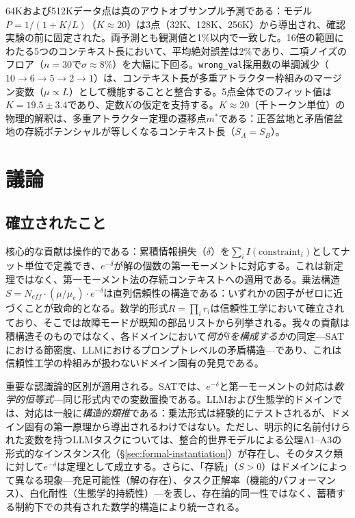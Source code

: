 \documentclass[11pt,a4paper]{article}
\begin{document}
\noindent 64Kおよび512Kデータ点は真のアウトオブサンプル予測である：モデル$P = 1/(1 + K/L)$（$K \approx 20$）は3点（32K、128K、256K）から導出され、確認実験の前に固定された。両予測とも観測値と1\%以内で一致した。16倍の範囲にわたる5つのコンテキスト長において、平均絶対誤差は2\%であり、二項ノイズのフロア（$n = 30$で$\sigma \approx 8\%$）を大幅に下回る。\texttt{wrong\_val}採用数の単調減少（$10 \to 6 \to 5 \to 2 \to 1$）は、コンテキスト長が多重アトラクター枠組みのマージン変数（$\mu \propto L$）として機能することと整合する。5点全体でのフィット値は$K = 19.5 \pm 3.4$であり、定数$K$の仮定を支持する。$K \approx 20$（千トークン単位）の物理的解釈は、多重アトラクター定理の遷移点$m^*$である：正答盆地と矛盾値盆地の存続ポテンシャルが等しくなるコンテキスト長（$S_A = S_B$）。

\section{議論}
\label{sec:discussion}

\subsection{確立されたこと}

核心的な貢献は操作的である：累積情報損失（$\delta$）を$\sum_i I(\text{constraint}_i)$としてナット単位で定義でき、$e^{-\delta}$が解の個数の第一モーメントに対応する。これは新定理ではなく、第一モーメント法\cite{alon2016}の存続コンテキストへの適用である。乗法構造$S = N_{eff} \cdot (\mu/\mu_c) \cdot e^{-\delta}$は直列信頼性の構造である：いずれかの因子がゼロに近づくことが致命的となる。数学的形式$R = \prod_i r_i$は信頼性工学において確立されており\cite{barlow1975}、そこでは故障モードが既知の部品リストから列挙される。我々の貢献は積構造そのものではなく、各ドメインにおいて\emph{何が$\delta$を構成するか}の同定---SATにおける節密度、LLMにおけるプロンプトレベルの矛盾構造---であり、これは信頼性工学の枠組みが扱わないドメイン固有の発見である。

重要な認識論的区別が適用される。SATでは、$e^{-\delta}$と第一モーメントの対応は\emph{数学的恒等式}---同じ形式内での変数置換である。LLMおよび生態学的ドメインでは、対応は一般に\emph{構造的類推}である：乗法形式は経験的にテストされるが、ドメイン固有の第一原理から導出されるわけではない。ただし、明示的に名前付けられた変数を持つLLMタスクについては、整合的世界モデルによる公理A1--A3の形式的なインスタンス化（\S\ref{sec:formal-instantiation}）が存在し、そのタスク類に対して$e^{-\delta}$は定理として成立する。さらに、「存続」（$S > 0$）はドメインによって異なる現象---充足可能性（解の存在）、タスク正解率（機能的パフォーマンス）、白化耐性（生態学的持続性）---を表し、存在論的同一性ではなく、蓄積する制約下での共有された数学的構造により統一される。
\end{document}
